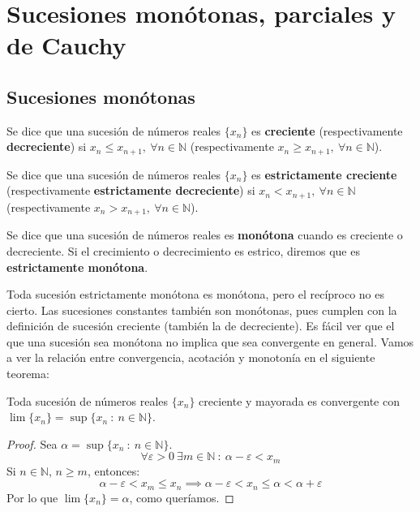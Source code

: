 \chapter{Sucesiones monótonas, parciales y de Cauchy}


\section{Sucesiones monótonas}
\begin{definicion}
    Se dice que una sucesión de números reales $\{x_n\}$ es \textbf{creciente} (respectivamente \textbf{decreciente}) si $x_n \leq x_{n+1}, ~\forall n \in \mathbb{N}$ (respectivamente $x_n \geq x_{n+1}, ~\forall n \in \mathbb{N}$).
\end{definicion}

\begin{definicion}
    Se dice que una sucesión de números reales $\{x_n\}$ es \textbf{estrictamente creciente} (respectivamente \textbf{estrictamente decreciente}) si $x_n < x_{n+1}, ~\forall n \in \mathbb{N}$ (respectivamente $x_n > x_{n+1}, ~\forall n \in \mathbb{N}$).
\end{definicion}

\begin{definicion}
    Se dice que una sucesión de números reales es \textbf{monótona} cuando es creciente o decreciente. Si el crecimiento o decrecimiento es estrico, diremos que es \textbf{estrictamente monótona}.
\end{definicion}

Toda sucesión estrictamente monótona es monótona, pero el recíproco no es cierto. Las sucesiones constantes también son monótonas, pues cumplen con la definición de sucesión creciente (también la de decreciente). Es fácil ver que el que una sucesión sea monótona no implica que sea convergente en general. Vamos a ver la relación entre convergencia, acotación y monotonía
en el siguiente teorema:
\begin{teo}
    Toda sucesión de números reales $\{x_n\}$ creciente y mayorada es convergente con $\lim \{x_n\}=\sup \{x_n ~:~ n \in \mathbb{N}\}$.
\end{teo}
\begin{proof}
    Sea $\alpha = \sup \{x_n ~:~ n \in \mathbb{N}\}$.
    \begin{equation*}
        \forall \varepsilon > 0 ~\exists m \in \mathbb{N} ~:~ \alpha - \varepsilon < x_m
    \end{equation*}
    Si $n \in \mathbb{N}$, $n \geq m$, entonces:
    \begin{equation*}
        \alpha - \varepsilon < x_m \leq x_n \implies \alpha - \varepsilon < x_n \leq \alpha < \alpha + \varepsilon
    \end{equation*}
    Por lo que $\lim \{x_n\} = \alpha$, como queríamos. 
\end{proof}

